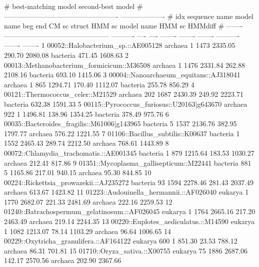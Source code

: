 \begin{sreoutputtinywide}
#                                                                        best-matching model                  second-best model 
#                                                         -------------------------------------------------  -------------------
#     idx  sequence name                                  model name   beg   end    CM sc   struct   HMM sc  model name   HMM sc  HMMdiff
# -------  ---------------------------------------------  ----------  ----  ----  -------  -------  -------  ----------  -------  -------
        1  00052::Halobacterium_sp.::AE005128             archaea        1  1473  2335.05   290.70  2080.08  bacteria     471.45  1608.63
        2  00013::Methanobacterium_formicicum::M36508     archaea        1  1476  2331.84   262.88  2108.16  bacteria     693.10  1415.06
        3  00004::Nanoarchaeum_equitans::AJ318041         archaea        1   865  1294.71   170.40  1112.07  bacteria     255.78   856.29
        4  00121::Thermococcus_celer::M21529              archaea      202  1687  2430.39   249.92  2223.71  bacteria     632.38  1591.33
        5  00115::Pyrococcus_furiosus::U20163|g643670     archaea      922     1  1496.81   138.96  1354.25  bacteria     378.49   975.76
        6  00035::Bacteroides_fragilis::M61006|g143965    bacteria       5  1537  2136.76   382.95  1797.77  archaea      576.22  1221.55
        7  01106::Bacillus_subtilis::K00637               bacteria       1  1552  2465.43   289.74  2212.50  archaea      768.61  1443.89
        8  00072::Chlamydia_trachomatis.::AE001345        bacteria       1   879  1215.64   183.53  1030.27  archaea      212.41   817.86
        9  01351::Mycoplasma_gallisepticum::M22441        bacteria     881     5  1165.86   217.01   940.15  archaea       95.30   844.85
       10  00224::Rickettsia_prowazekii.::AJ235272        bacteria      93  1594  2278.46   281.43  2037.49  archaea      613.67  1423.82
       11  01223::Audouinella_hermannii.::AF026040        eukarya        1  1770  2682.07   221.33  2481.69  archaea      222.16  2259.53
       12  01240::Batrachospermum_gelatinosum.::AF026045  eukarya        1  1764  2665.16   217.20  2463.49  archaea      219.14  2244.35
       13  00220::Euplotes_aediculatus.::M14590           eukarya        1  1082  1213.07    78.14  1103.29  archaea       96.64  1006.65
       14  00229::Oxytricha_granulifera.::AF164122        eukarya      600     1   851.30    23.53   788.12  archaea       86.31   701.81
       15  01710::Oryza_sativa.::X00755                   eukarya       75  1886  2687.06   142.17  2570.56  archaea      202.90  2367.66
\end{sreoutputtinywide}

